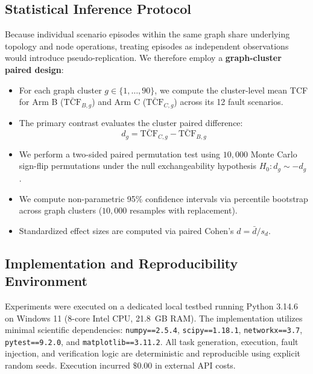 \subsection{Statistical Inference Protocol}
Because individual scenario episodes within the same graph share underlying topology and node operations, treating episodes as independent observations would introduce pseudo-replication. We therefore employ a \textbf{graph-cluster paired design}:
\begin{itemize}
    \item For each graph cluster $g \in \{1, \dots, 90\}$, we compute the cluster-level mean TCF for Arm B ($\bar{\text{TCF}}_{B, g}$) and Arm C ($\bar{\text{TCF}}_{C, g}$) across its 12 fault scenarios.
    \item The primary contrast evaluates the cluster paired difference:
    \begin{equation}
        d_g = \bar{\text{TCF}}_{C, g} - \bar{\text{TCF}}_{B, g}
    \end{equation}
    \item We perform a two-sided paired permutation test using $10,000$ Monte Carlo sign-flip permutations under the null exchangeability hypothesis $H_0: d_g \sim -d_g$.
    \item We compute non-parametric 95\% confidence intervals via percentile bootstrap across graph clusters ($10,000$ resamples with replacement).
    \item Standardized effect sizes are computed via paired Cohen's $d = \bar{d} / s_d$.
\end{itemize}

\subsection{Implementation and Reproducibility Environment}
Experiments were executed on a dedicated local testbed running Python 3.14.6 on Windows 11 (8-core Intel CPU, 21.8~GB RAM). The implementation utilizes minimal scientific dependencies: \texttt{numpy==2.5.4}, \texttt{scipy==1.18.1}, \texttt{networkx==3.7}, \texttt{pytest==9.2.0}, and \texttt{matplotlib==3.11.2}. All task generation, execution, fault injection, and verification logic are deterministic and reproducible using explicit random seeds. Execution incurred $\$0.00$ in external API costs.
